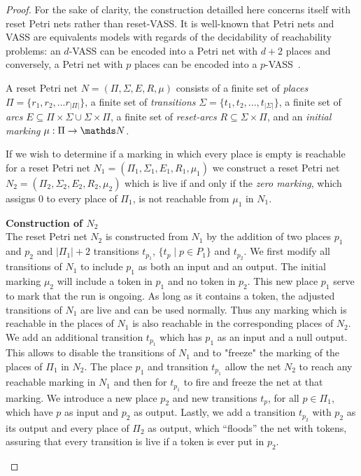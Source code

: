 \begin{proof}

For the sake of clarity, the construction detailled here concerns itself with reset Petri nets rather than reset-VASS. It is well-known that Petri nets and VASS are equivalents models with regards of the decidability of reachability problems: an $d$-VASS can be encoded into a Petri net with $d+2$ places and conversely, a Petri net with $p$ places can be encoded into a $p$-VASS~\cite{DBLP:journals/siglog/Schmitz16}.

A reset Petri net $N = (\Pi, \Sigma, E, R, \mu)$ consists of a finite set of {\em places} $\Pi = \{r_1, r_2, ... r_{|\Pi|}\}$, a finite set of {\em transitions} $\Sigma = \{t_1, t_2, ..., t_{|\Sigma|} \}$, a finite set of {\em arcs} $E \subseteq \Pi \times \Sigma \cup \Sigma \times \Pi$, a finite set of
{\em reset-arcs} $R \subseteq \Sigma \times \Pi$, and an {\em initial marking} $\mu : \Pi \to \N$.


If we wish to determine if a marking in which every place is empty is reachable for a reset Petri net
 $N_1 = (\Pi_1, \Sigma_1, E_1, R_1, \mu_1)$ %
 we construct a reset Petri net
 $N_2 = (\Pi_2, \Sigma_2, E_2, R_2, \mu_2)$ %
  which is live if and only if the {\em zero marking}, which assigns $0$ to every place of $\Pi_1$, is not reachable from $\mu_1$ in $N_1$. \\

\begin{samepage}
{\bf Construction of $N_2$} \\
\indent
The reset Petri net $N_2$ is constructed from $N_1$ by the addition of two places $p_1$ and $p_2$ and $|\Pi_1| +2$ transitions $t_{p_1}$, $\{ t_p \mid p \in P_1 \}$ and $t_{p_2}$.
We first modify all transitions of $N_1$ to include $p_1$ as both an input and an output.
The initial marking $\mu_2$ will include a token in $p_1$ and no token in $p_2$. 
This new place $p_1$ serve to mark that the run is ongoing. As long as it contains a token, the adjusted transitions of $N_1$ are live and can be used normally. Thus any marking which is reachable in the places of $N_1$ is also reachable in the corresponding places of $N_2$.
We add an additional transition $t_{p_1}$ %
which has $p_1$ as an input and a null output.
This allows to disable the transitions of $N_1$ and to "freeze" the marking of the places of $\Pi_1$ in $N_2$.
 The place $p_1$ and transition $t_{p_1}$ allow the net $N_2$ to reach any reachable marking in $N_1$ and then for $t_{p_1}$ to fire and freeze the net at that marking.
We introduce a new place $p_2$ and new transitions $t_p$, for all $p \in \Pi_1$, which have $p$ as input and $p_2$ as output.
Lastly, we add a transition $t_{p_2}$ with $p_2$ as its output and every place of $\Pi_2$ as output, which ``floods'' the net with tokens, assuring that every transition is live if a token is ever
put in $p_2$.
\end{samepage}


\end{proof}
